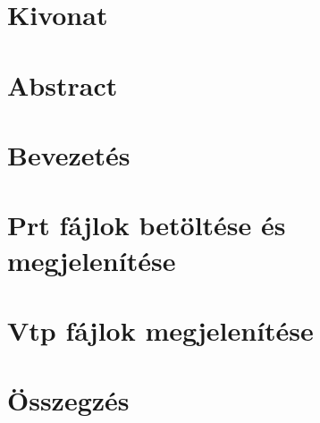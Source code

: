 \documentclass[11pt,a4paper,twoside]{report}
\begin{document}


\pagestyle{empty}
\tableofcontents



\chapter*{Kivonat}


\chapter*{Abstract}


\pagestyle{fancy}
\renewcommand{\chaptermark}[1]{\markboth{#1}{}}
\chapter{Bevezetés}


\chapter{Prt fájlok betöltése és megjelenítése}


\chapter{Vtp fájlok megjelenítése}


\chapter{Összegzés}


\renewcommand{\bibname}{Irodalomjegyzék}
\nocite{*}
\clearpage
{}
{}
\printbibliography

\pagestyle{empty}

\clearpage
{}
{}
\listoffigures
\end{document}
